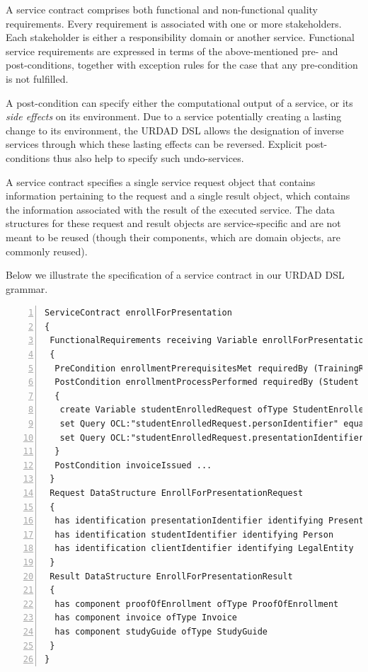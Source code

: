 A service contract comprises both functional and non-functional quality requirements. Every requirement is associated with one or more stakeholders. Each stakeholder is either a responsibility domain or another service. Functional service requirements are expressed in terms of the above-mentioned pre- and post-conditions, together with exception rules for the case that any pre-condition is not fulfilled. 

A post-condition can specify either the computational output of a service, or its \emph{side effects} on its environment. Due to a service potentially creating a lasting change to its environment, the URDAD DSL allows the designation of inverse services through which these lasting effects can be reversed. Explicit post-conditions thus also help to specify such undo-services.

A service contract specifies a single service request object that contains information pertaining to the request and a single result object, which contains the information associated with the result of the executed service. The data structures for these request and result objects are service-specific and are not meant to be reused (though their components, which are domain objects, are commonly reused). 

Below we illustrate the specification of a service contract in our URDAD DSL grammar.
\lstset{language=urdad,caption=Specifying a service contract in the textual URDAD DSL syntax.,label=contractTextSyntax}
\begin{lstlisting}[numbers=left,escapechar=|]
ServiceContract enrollForPresentation
{
 FunctionalRequirements receiving Variable enrollForPresentationRequest ofType EnrollForPresentationRequest
 {
  PreCondition enrollmentPrerequisitesMet requiredBy (TrainingRegulator Student) raises EnrollmentPrerequisitesNotSatisfiedException checks constraint enrollmentPrerequisitesForPresentationMet with ValueOf enrollForPresentationRequest
  PostCondition enrollmentProcessPerformed requiredBy (Student Client TrainingRegulator) ensures constraint studentEnrolledForPresentation          with ValueOf studentEnrolledRequest constructedUsing doSequential
  {
   create Variable studentEnrolledRequest ofType StudentEnrolledRequest
   set Query OCL:"studentEnrolledRequest.personIdentifier" equalTo Query OCL:"enrollForPresentationRequest.personIdentifier"                            
   set Query OCL:"studentEnrolledRequest.presentationIdentifier" equalTo Query OCL:"enrollForPresentationRequest.presentationIdentifier"                            
  }  
  PostCondition invoiceIssued ...
 }            
 Request DataStructure EnrollForPresentationRequest 
 {
  has identification presentationIdentifier identifying Presentation
  has identification studentIdentifier identifying Person
  has identification clientIdentifier identifying LegalEntity         
 }
 Result DataStructure EnrollForPresentationResult 
 {
  has component proofOfEnrollment ofType ProofOfEnrollment
  has component invoice ofType Invoice
  has component studyGuide ofType StudyGuide
 }
}
\end{lstlisting}

